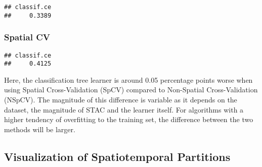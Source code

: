\documentclass[
]{scrbook}
\newenvironment{Shaded}{\begin{snugshade}}{\end{snugshade}}
\newcommand{\AttributeTok}[1]{\textcolor[rgb]{0.77,0.63,0.00}{#1}}
\newcommand{\DecValTok}[1]{\textcolor[rgb]{0.00,0.00,0.81}{#1}}
\newcommand{\FunctionTok}[1]{\textcolor[rgb]{0.00,0.00,0.00}{#1}}
\newcommand{\NormalTok}[1]{#1}
\newcommand{\OtherTok}[1]{\textcolor[rgb]{0.56,0.35,0.01}{#1}}
\newcommand{\SpecialCharTok}[1]{\textcolor[rgb]{0.00,0.00,0.00}{#1}}
\newcommand{\StringTok}[1]{\textcolor[rgb]{0.31,0.60,0.02}{#1}}
\renewenvironment{Shaded} {\begin{snugshade}\small} {\end{snugshade}}
\begin{document}
\begin{verbatim}
## classif.ce 
##     0.3389
\end{verbatim}

\hypertarget{sp-cv}{%
\subsubsection{Spatial CV}\label{sp-cv}}

\begin{Shaded}
\end{Shaded}

\begin{verbatim}
## classif.ce 
##     0.4125
\end{verbatim}

Here, the classification tree learner is around 0.05 percentage points worse when using Spatial Cross-Validation (SpCV) compared to Non-Spatial Cross-Validation (NSpCV).
The magnitude of this difference is variable as it depends on the dataset, the magnitude of STAC and the learner itself.
For algorithms with a higher tendency of overfitting to the training set, the difference between the two methods will be larger.

\hypertarget{vis-spt-partitions}{%
\subsection{Visualization of Spatiotemporal Partitions}\label{vis-spt-partitions}}
\end{document}
